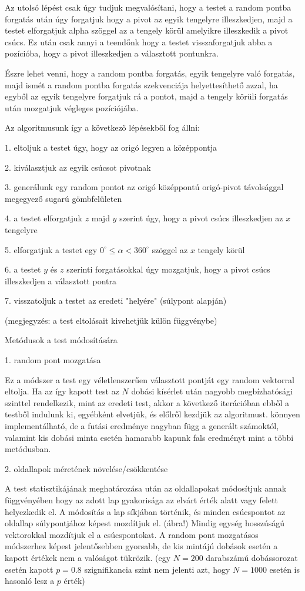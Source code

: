Az utolsó lépést csak úgy tudjuk megvalósítani, hogy a testet a random pontba forgatás után úgy forgatjuk hogy a pivot az egyik tengelyre illeszkedjen, majd a testet elforgatjuk alpha szöggel az a tengely körül amelyikre illeszkedik a pivot csúcs. Ez után csak annyi a teendőnk hogy a testet visszaforgatjuk abba a pozícióba, hogy a pivot illeszkedjen a választott pontunkra.

Észre lehet venni, hogy a random pontba forgatás, egyik tengelyre való forgatás, majd ismét a random pontba forgatás szekvenciája helyettesíthető azzal, ha egyből az egyik tengelyre forgatjuk rá a pontot, majd a tengely körüli forgatás  után mozgatjuk végleges pozíciójába.

Az algoritmusunk így a következő lépésekből fog állni:

1. eltoljuk a testet úgy, hogy az origó legyen a középpontja

2. kiválasztjuk az egyik csúcsot pivotnak

3. generálunk egy random pontot az origó középpontú origó-pivot távolsággal megegyező sugarú gömbfelületen

4. a testet elforgatjuk $z$ majd $y$ szerint úgy, hogy a pivot csúcs illeszkedjen az $x$ tengelyre

5. elforgatjuk a testet egy $0^\circ \leq \alpha < 360^\circ$ szöggel az $x$ tengely körül

6. a testet $y$ és $z$ szerinti forgatásokkal úgy mozgatjuk, hogy a pivot csúcs illeszkedjen a választott pontra

7. visszatoljuk a testet az eredeti "helyére" (súlypont alapján)

(megjegyzés: a test eltolásait kivehetjük külön függvénybe)

Metódusok a test módosítására

1. random pont mozgatása

Ez a módszer a test egy véletlenszerűen választott pontját egy random vektorral eltolja.
Ha az így kapott test az $N$ dobási kísérlet után nagyobb megbízhatósági szinttel rendelkezik, mint az eredeti test, akkor a következő iterációban ebből a testből indulunk ki, egyébként elvetjük, és előlről kezdjük az algoritmust.
könnyen implementálható, de a futási eredménye nagyban függ a generált számoktól, valamint kis dobási minta esetén hamarabb kapunk fals eredményt mint a többi metódusban.

2. oldallapok méretének növelése/csökkentése

A test statisztikájának meghatározása után az oldallapokat módosítjuk annak függvényében hogy az adott lap gyakorisága az elvárt érték alatt vagy felett helyezkedik el.
A módosítás a lap síkjában történik, és minden csúcspontot az oldallap súlypontjához képest mozdítjuk el. (ábra!)
Mindig egység hosszúságú vektorokkal mozdítjuk el a csúcspontokat.
A random pont mozgatásos módszerhez képest jelentősebben gyorsabb, de kis mintájú dobások esetén a kapott értékek nem a valóságot tükrözik. (egy $N=200$ darabszámú dobássorozat esetén kapott $p=0.8$ szignifikancia szint nem jelenti azt, hogy $N=1000$ esetén is hasonló lesz a $p$ érték)

